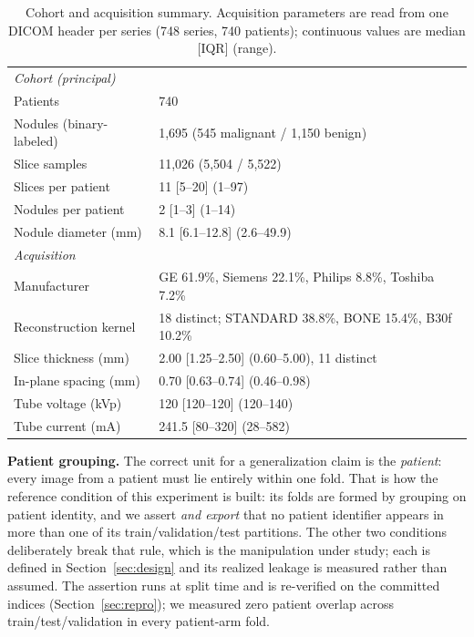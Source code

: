 \documentclass{ieeeaccess}
\begin{document}
\begin{table}[t]
\centering
\caption{Cohort and acquisition summary. Acquisition parameters are read from one DICOM header per
series (748 series, 740 patients); continuous values are median [IQR] (range).}
\label{tab:cohort}
\small
\begin{tabular}{ll}
\hline
\multicolumn{2}{l}{\emph{Cohort (principal)}}\\
Patients & 740 \\
Nodules (binary-labeled) & 1{,}695 (545 malignant / 1{,}150 benign) \\
Slice samples & 11{,}026 (5{,}504 / 5{,}522) \\
Slices per patient & 11 [5--20] (1--97) \\
Nodules per patient & 2 [1--3] (1--14) \\
Nodule diameter (mm) & 8.1 [6.1--12.8] (2.6--49.9) \\
\hline
\multicolumn{2}{l}{\emph{Acquisition}}\\
Manufacturer & GE 61.9\%, Siemens 22.1\%, Philips 8.8\%, Toshiba 7.2\% \\
Reconstruction kernel & 18 distinct; STANDARD 38.8\%, BONE 15.4\%, B30f 10.2\% \\
Slice thickness (mm) & 2.00 [1.25--2.50] (0.60--5.00), 11 distinct \\
In-plane spacing (mm) & 0.70 [0.63--0.74] (0.46--0.98) \\
Tube voltage (kVp) & 120 [120--120] (120--140) \\
Tube current (mA) & 241.5 [80--320] (28--582) \\
\hline
\end{tabular}
\end{table}

\textbf{Patient grouping.} The correct unit for a generalization claim is the \emph{patient}: every
image from a patient must lie entirely within one fold. That is how the reference condition of this
experiment is built: its folds are formed by grouping on patient identity, and we assert \emph{and
export} that no patient identifier appears in more than one of its train/validation/test partitions.
The other two conditions deliberately break that rule, which is the manipulation under study; each is
defined in Section~\ref{sec:design} and its realized leakage is measured rather than assumed. The assertion runs at split
time and is re-verified on the committed indices (Section~\ref{sec:repro}); we measured zero
patient overlap across train/test/validation in every patient-arm fold.
\end{document}
